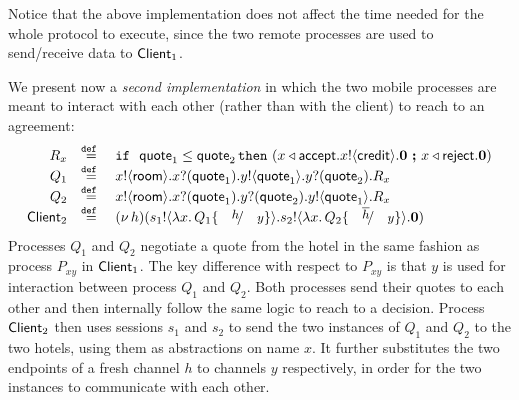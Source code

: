 \documentclass[a4paper,UKenglish]{lipics}
\theoremstyle{definition}
\begin{document}
\begin{example}
Notice that	the above implementation does not affect
the time needed for the whole protocol to execute,
since the two remote processes are used
to send/receive data to $\mathsf{Client}_1$.

We present now a \emph{second  implementation}
in which the two mobile processes are meant 
to interact with each other (rather than with the client) to reach to an agreement:
%
\[
	\begin{array}{rcl}
	    R_x & \defeq & \If\ \Quote_1 \leq \Quote_2 \, \Then  (\bsel{x}{\accept} \bout{x}{\creditc} \inact \  \Else \ \bsel{x}{\reject} \inact) \\
		Q_1 &\defeq&	\bout{x}{\rtype} \binp{x}{\Quote_1} \bout{y}{\Quote_1} \binp{y}{\Quote_2} R_x \\
		Q_2 &\defeq&	\bout{x}{\rtype} \binp{x}{\Quote_1} \binp{y}{\Quote_2} \bout{y}{\Quote_1} R_x \\
		\Client_2 &\defeq& \newsp{h}{\bout{s_1}{\abs{x}{Q_1 \subst{h}{y}}} \bout{s_2}{\abs{x}{Q_2 \subst{\dual{h}}{y}}} \inact}
	\end{array}
\]
Processes $Q_1$ and $Q_2$  negotiate a quote from the
		hotel in the same fashion as process $P_{xy}$ in $\mathsf{Client}_1$.
		The key difference with respect to $P_{xy}$ is that $y$ is used for
		interaction between process $Q_1$ and $Q_2$. Both processes send
		their quotes to each other and then internally follow the same
		logic to reach to a decision.
		Process  $\mathsf{Client}_2$ then uses sessions $s_1$ and $s_2$ to send the two
		instances of $Q_1$ and $Q_2$ to the two hotels, using them 
	 as abstractions
		on name $x$. It further substitutes
		the two endpoints of a fresh channel $h$ to channels $y$ respectively,
		in order for the two instances to communicate with each other.




\end{example}
\end{document}
